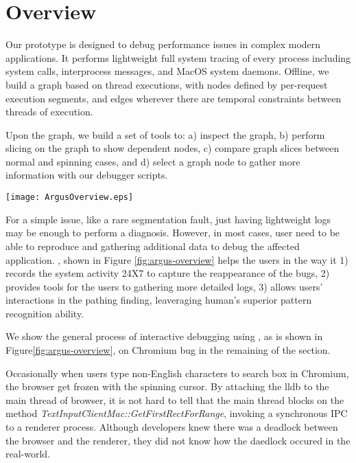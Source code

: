 \section{Overview}
\label{sec:overview}

Our \xxx prototype is designed to debug performance issues in complex modern applications.
It performs lightweight full system tracing of every process including system calls,
interprocess messages, and MacOS system daemons.
Offline, we build a graph based on thread executions, with nodes defined by
per-request execution segments,
and edges wherever there are temporal constraints between threads of execution.

Upon the graph, we build a set of tools to:
a) inspect the graph,
b) perform slicing on the graph to show dependent nodes,
c) compare graph slices between normal and spinning cases, and
d) select a graph node to gather more information with our debugger scripts.

\begin{figure*}[tb]
    \centering
    \texttt{[image: ArgusOverview.eps]}
    \caption{Design Overview}
    \label{fig:argus-overview}
\end{figure*}

For a simple issue, like a rare segmentation fault,
just having lightweight logs may be enough to perform a diagnosis.
However, in most cases, user need to be able to reproduce and gathering
additional data to debug the affected application.
\xxx, shown in Figure \ref{fig:argus-overview} helps the users in the way
it 1) records the system activity 24X7 to capture the reappearance of the bugs,
2) provides tools for the users to gathering more detailed logs,
3) allows users' interactions in the pathing finding,
leaveraging human's superior pattern recognition ability.

We show the general process of interactive debugging using \xxx,
as is shown in Figure\ref{fig:argus-overview},
on Chromium bug in the remaining of the section.

Occasionally when users type non-English characters to search box in Chromium,
the browser get frozen with the spinning cursor.
By attaching the lldb to the main thread of browser, it is not hard to tell that
the main thread blocks on the method \textit{TextInputClientMac::GetFirstRectForRange},
invoking a synchronous IPC to a renderer process.
Although developers knew there was a deadlock between the browser and the renderer,
they did not know how the daedlock occured in the real-world.



